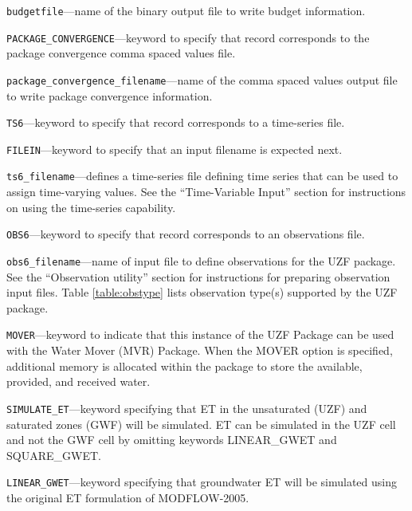\begin{description}
\item \texttt{budgetfile}---name of the binary output file to write budget information.

\item \texttt{PACKAGE\_CONVERGENCE}---keyword to specify that record corresponds to the package convergence comma spaced values file.

\item \texttt{package\_convergence\_filename}---name of the comma spaced values output file to write package convergence information.

\item \texttt{TS6}---keyword to specify that record corresponds to a time-series file.

\item \texttt{FILEIN}---keyword to specify that an input filename is expected next.

\item \texttt{ts6\_filename}---defines a time-series file defining time series that can be used to assign time-varying values. See the ``Time-Variable Input'' section for instructions on using the time-series capability.

\item \texttt{OBS6}---keyword to specify that record corresponds to an observations file.

\item \texttt{obs6\_filename}---name of input file to define observations for the UZF package. See the ``Observation utility'' section for instructions for preparing observation input files. Table \ref{table:obstype} lists observation type(s) supported by the UZF package.

\item \texttt{MOVER}---keyword to indicate that this instance of the UZF Package can be used with the Water Mover (MVR) Package.  When the MOVER option is specified, additional memory is allocated within the package to store the available, provided, and received water.

\item \texttt{SIMULATE\_ET}---keyword specifying that ET in the unsaturated (UZF) and saturated zones (GWF) will be simulated. ET can be simulated in the UZF cell and not the GWF cell by omitting keywords LINEAR\_GWET and SQUARE\_GWET.

\item \texttt{LINEAR\_GWET}---keyword specifying that groundwater ET will be simulated using the original ET formulation of MODFLOW-2005.


\end{description}

